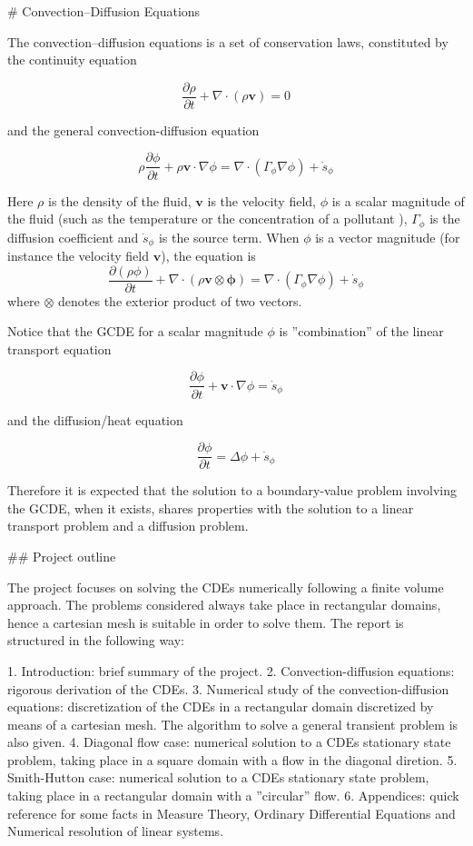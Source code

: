# Convection--Diffusion Equations

The convection--diffusion equations is a set of conservation laws, constituted
by the continuity equation 

$$
\frac{\partial \rho}{\partial t} + \nabla \cdot (\rho \mathbf{v}) = 0
$$ 

and the general convection-diffusion equation 

$$
\rho \frac{\partial \phi}{\partial t} + \rho \mathbf{v} \cdot \nabla \phi = \nabla \cdot \left( \Gamma_\phi \nabla \phi \right) + \dot{s}_\phi
$$ 

Here $\rho$ is the density of the fluid, $\mathbf{v}$ is the velocity field,
$\phi$ is a scalar magnitude of the fluid (such as the temperature or the
concentration of a pollutant ), $\Gamma_\phi$ is the diffusion coefficient and
$\dot{s}_\phi$ is the source term. When $\phi$ is a vector magnitude (for
instance the velocity field $\mathbf{v}$), the equation is $$\frac{\partial(\rho
\phi)}{\partial t} + \nabla \cdot (\rho \mathbf{v} \otimes \mathbf{\phi}) =
\nabla \cdot \left( \Gamma_\phi \nabla \phi \right) + \dot{s}_\phi$$ where
$\otimes$ denotes the exterior product of two vectors.

Notice that the GCDE for a scalar magnitude $\phi$ is ''combination'' of the linear transport equation 

$$
\frac{\partial \phi}{\partial t} + \mathbf{v} \cdot \nabla \phi = \dot{s}_\phi
$$

and the diffusion/heat equation

$$
\frac{\partial \phi}{\partial t} = \Delta \phi + \dot{s}_\phi
$$

Therefore it is expected that the solution to a boundary-value problem involving the GCDE, when it exists, shares properties with the solution to a linear transport problem and a diffusion problem.

## Project outline

The project focuses on solving the CDEs numerically following a finite volume approach. The problems considered always take place in rectangular domains, hence a cartesian mesh is suitable in order to solve them. The report is structured in the following way:

1. Introduction: brief summary of the project.
2. Convection-diffusion equations: rigorous derivation of the CDEs.
3. Numerical study of the convection-diffusion equations: discretization of the CDEs in a rectangular domain discretized by means of a cartesian mesh. The algorithm to solve a general transient problem is also given.
4. Diagonal flow case: numerical solution to a CDEs stationary state problem, taking place in a square domain with a flow in the diagonal diretion.
5. Smith-Hutton case: numerical solution to a CDEs stationary state problem, taking place in a rectangular domain with a ''circular'' flow.
6. Appendices: quick reference for some facts in Measure Theory, Ordinary Differential Equations and Numerical resolution of linear systems.

